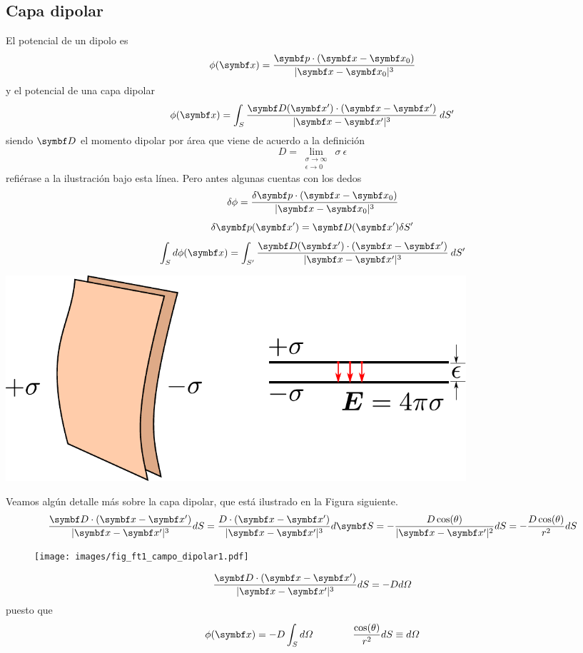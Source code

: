 \documentclass[10pt,oneside]{CBFT_book}
\begin{document}
\subsection{Capa dipolar}

El potencial de un dipolo es
\[
	\phi(\vb{x}) = \frac{ \vb{p}\cdot(\vb{x}-\vb{x}_0) }{|\vb{x} - \vb{x}_0|^3} 
\]
y el potencial de una capa dipolar
\[
	\phi(\vb{x}) = \int_S \frac{ \vb{D}(\vb{x}')\cdot(\vb{x}-\vb{x}') }{|\vb{x} - \vb{x}'|^3} \: dS'
\]
siendo $\vb{D}$ el momento dipolar por área que viene de acuerdo a la definición
\[
	D = \lim_{\substack{\sigma\to\infty \\ \epsilon\to 0}} \: \sigma \: \epsilon
\]
refiérase a la ilustración bajo esta línea. Pero antes algunas cuentas con los dedos
\[
	\delta \phi = \frac{ \delta \vb{p}\cdot(\vb{x}-\vb{x}_0) }{|\vb{x} - \vb{x}_0|^3} 
\]
\[
	\delta \vb{p}(\vbx') = \vb{D}(\vbx') \delta S'
\]
\[
	\int_S d \phi(\vb{x}) = 
	\int_{S'} \frac{ \vb{D}(\vb{x}')\cdot(\vb{x}-\vb{x}') }{|\vb{x} - \vb{x}'|^3} \: dS'
\]

	\includegraphics[width=0.75\textwidth]{images/fig_ft1_campo_dipolar3.pdf}	 

Veamos algún detalle más sobre la capa dipolar, que está ilustrado en la Figura siguiente.
\[
	\frac{ \vb{D}\cdot(\vb{x}-\vb{x}')}{|\vb{x} - \vb{x}'|^3} dS = 
	\frac{ D \cdot(\vb{x}-\vb{x}')}{|\vb{x} - \vb{x}'|^3} d\vb{S} = 
	- \frac{ D \cos(\theta)}{|\vb{x} - \vb{x}'|^2} dS = 
	- \frac{ D \cos(\theta)}{r^2} dS  
\]

\begin{figure}[htb]
	\begin{center}
	\texttt{[image: images/fig\_ft1\_campo\_dipolar1.pdf]}	 
	\end{center}
	\caption{}
\end{figure}

\[
	\frac{ \vb{D}\cdot(\vb{x}-\vb{x}')}{|\vb{x} - \vb{x}'|^3} dS = - D d\Omega
\]
puesto que
\[
	\phi(\vb{x}) = -D \int_S d\Omega \qquad \qquad \frac{\cos(\theta)}{r^2}dS \equiv d\Omega
\]
\end{document}
